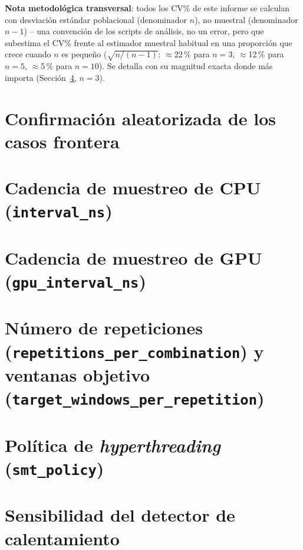 \documentclass[11pt]{article}
\begin{document}
\textbf{Nota metodológica transversal}: todos los CV\% de este informe se
calculan con desviación estándar poblacional (denominador $n$), no
muestral (denominador $n-1$) -- una convención de los scripts de análisis,
no un error, pero que subestima el CV\% frente al estimador muestral
habitual en una proporción que crece cuando $n$ es pequeño ($\sqrt{n/(n-1)}$:
$\approx$22\,\% para $n=3$, $\approx$12\,\% para $n=5$, $\approx$5\,\% para
$n=10$). Se detalla con su magnitud exacta donde más importa
(Sección~\ref{sec:repetitions}, $n=3$).

\section{Confirmación aleatorizada de los casos frontera}
\label{sec:randomized-confirmation}



\section{Cadencia de muestreo de CPU (\texttt{interval\_ns})}
\label{sec:interval-ns}



\section{Cadencia de muestreo de GPU (\texttt{gpu\_interval\_ns})}
\label{sec:gpu-interval-ns}



\section[Repeticiones y ventanas objetivo]{Número de repeticiones (\texttt{repetitions\_per\_combination}) y ventanas objetivo (\texttt{target\_windows\_per\_repetition})}
\label{sec:repetitions}



\section{Política de \textit{hyperthreading} (\texttt{smt\_policy})}
\label{sec:smt-policy}



\section{Sensibilidad del detector de calentamiento}
\label{sec:warmup-sensitivity}
\end{document}
